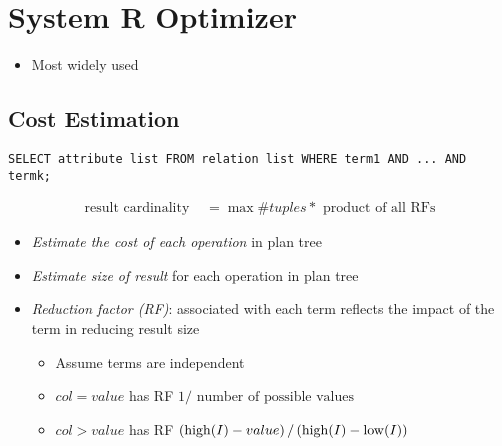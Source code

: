 \section{System R Optimizer}

  \begin{itemize}
    \item Most widely used
  \end{itemize}

  \subsection{Cost Estimation}

    \begin{lstlisting}
SELECT attribute list FROM relation list WHERE term1 AND ... AND termk;
    \end{lstlisting}

    \begin{align}
      \text{result cardinality } &= \max \# tuples * \text{ product of all RFs}
    \end{align}

    \begin{itemize}
      \item \emph{Estimate the cost of each operation} in plan tree
      \item \emph{Estimate size of result} for each operation in plan tree
      \item \emph{Reduction factor (RF)}: associated with each term reflects
      the impact of the term in reducing result size
      \begin{itemize}
        \item Assume terms are independent
        \item $ col = value $ has RF $ 1 / \text{ number of possible values} $
        \item $ col > value $ has RF
        $ \left( \operatorname{high}(I) - value \right) / \left( \operatorname{high}(I) - \operatorname{low}(I)  \right) $
      \end{itemize}
    \end{itemize}
